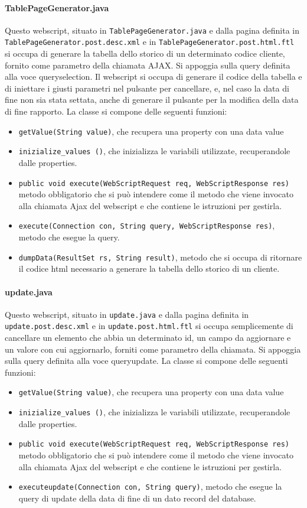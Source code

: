 \paragraph{TablePageGenerator.java}
Questo webscript, situato in \texttt{TablePageGenerator.java} e dalla pagina definita in \texttt{TablePageGenerator.post.desc.xml} e in \texttt{TablePageGenerator.post.html.ftl}  si occupa di generare la tabella dello storico di un determinato codice cliente, fornito come parametro della chiamata AJAX. Si appoggia sulla query definita alla voce queryselection.
Il webscript si occupa di generare il codice della tabella e di iniettare i giusti parametri nel pulsante per cancellare, e, nel caso la data di fine non sia stata settata, anche di generare il pulsante per la modifica della data di fine rapporto.
La classe si compone delle seguenti funzioni:
\begin{itemize}
\item \texttt{getValue(String value)}, che recupera una property con una data value
\item \texttt{inizialize\_values ()}, che inizializza le variabili utilizzate, recuperandole dalle properties.
\item \texttt{public void execute(WebScriptRequest req, WebScriptResponse res)} metodo obbligatorio che si può intendere come il metodo che viene invocato alla chiamata Ajax del webscript e che contiene le istruzioni per gestirla.
\item \texttt{execute(Connection con, String query, WebScriptResponse res)}, metodo che esegue la query.
\item \texttt{dumpData(ResultSet rs, String result)}, metodo che si occupa di ritornare il codice html necessario a generare la tabella dello storico di un cliente.
\end{itemize}
\paragraph{update.java}
Questo webscript, situato in \texttt{update.java} e dalla pagina definita in \texttt{update.post.desc.xml} e in \texttt{update.post.html.ftl}  si occupa semplicemente di cancellare un elemento che abbia un determinato id, un campo da aggiornare e un valore con cui aggiornarlo,  forniti come parametro della chiamata. Si appoggia sulla query definita alla voce queryupdate.
La classe si compone delle seguenti funzioni:
\begin{itemize}
\item \texttt{getValue(String value)}, che recupera una property con una data value
\item \texttt{inizialize\_values ()}, che inizializza le variabili utilizzate, recuperandole dalle properties.
\item \texttt{public void execute(WebScriptRequest req, WebScriptResponse res)} metodo obbligatorio che si può intendere come il metodo che viene invocato alla chiamata Ajax del webscript e che contiene le istruzioni per gestirla.
\item \texttt{executeupdate(Connection con, String query)}, metodo che esegue la query di update della data di fine di un dato record del database.
\end{itemize}

